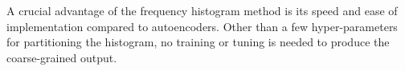 A crucial advantage of the frequency histogram method is its speed and ease of
implementation compared to autoencoders. Other than a few hyper-parameters for
partitioning the histogram, no training or tuning is needed to produce the
coarse-grained output.

\begin{figure}[htbp]
  \centering
  \begin{subfigure}{.052\linewidth}

\end{subfigure}
\end{figure}
